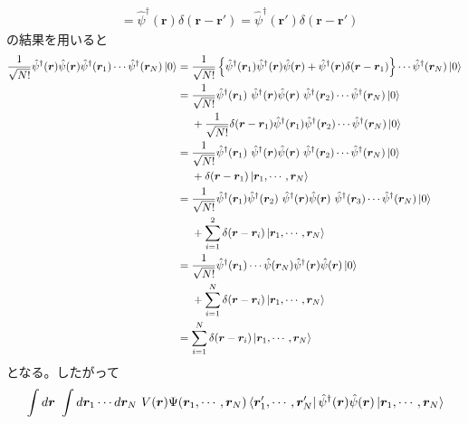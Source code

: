 \documentclass[dvipdfmx, 11pt, a4paper]{jsarticle}
\theoremstyle{definition}
\numberwithin{equation}{section}
\begin{document}
\begin{derivationBox}
\begin{align}
            &=\hat{\psi}^\dagger(\bm{r}) \delta(\bm{r}-\bm{r'}) =\hat{\psi}^\dagger(\bm{r}') \delta(\bm{r}-\bm{r'}) 
        \end{align}
        の結果を用いると
        \begin{align}
            \frac{1}{\sqrt{N!}}\hat{\psi}^\dagger(\bm{r})\hat{\psi}(\bm{r}) \hat{\psi}^\dagger(\bm{r}_1)\cdots\hat{\psi}^\dagger(\bm{r}_N)\ket{0} &= \frac{1}{\sqrt{N!}}\left\{ \hat{\psi}^\dagger(\bm{r}_1)\hat{\psi}^\dagger(\bm{r})\hat{\psi}(\bm{r}) + \hat{\psi}^\dagger(\bm{r}) \delta(\bm{r}-\bm{r}_1)  \right\}\cdots\hat{\psi}^\dagger(\bm{r}_N)\ket{0} \notag \\
            &= \frac{1}{\sqrt{N!}} \hat{\psi}^\dagger(\bm{r}_1)\ \hat{\psi}^\dagger(\bm{r})\hat{\psi}(\bm{r})\ \hat{\psi}^\dagger(\bm{r}_2)\cdots\hat{\psi}^\dagger(\bm{r}_N)\ket{0} \notag \\
            &\ \ \ \ + \frac{1}{\sqrt{N!}} \delta(\bm{r}-\bm{r}_1)\hat{\psi}^\dagger(\bm{r}_1)\hat{\psi}^\dagger(\bm{r}_2)\cdots\hat{\psi}^\dagger(\bm{r}_N)\ket{0} \notag \\
            &= \frac{1}{\sqrt{N!}} \hat{\psi}^\dagger(\bm{r}_1)\ \hat{\psi}^\dagger(\bm{r})\hat{\psi}(\bm{r})\ \hat{\psi}^\dagger(\bm{r}_2)\cdots\hat{\psi}^\dagger(\bm{r}_N)\ket{0} \notag \\
            &\ \ \ \ + \delta(\bm{r}-\bm{r}_1)\ket{\bm{r}_1,\cdots,\bm{r}_N} \notag \\
            &= \frac{1}{\sqrt{N!}} \hat{\psi}^\dagger(\bm{r}_1)\hat{\psi}^\dagger(\bm{r}_2)\ \hat{\psi}^\dagger(\bm{r})\hat{\psi}(\bm{r})\ \hat{\psi}^\dagger(\bm{r}_3)\cdots\hat{\psi}^\dagger(\bm{r}_N)\ket{0} \notag \\
            &\ \ \ \ + \sum_{i=1}^2\delta(\bm{r}-\bm{r}_i)\ket{\bm{r}_1,\cdots,\bm{r}_N} \notag \\
            &= \frac{1}{\sqrt{N!}} \hat{\psi}^\dagger(\bm{r}_1)\cdots \hat{\psi}(\bm{r}_N) \hat{\psi}^\dagger(\bm{r})\hat{\psi}(\bm{r})\ket{0} \notag \\
            &\ \ \ \ + \sum_{i=1}^N\delta(\bm{r}-\bm{r}_i)\ket{\bm{r}_1,\cdots,\bm{r}_N} \notag \\
            &= \sum_{i=1}^N\delta(\bm{r}-\bm{r}_i)\ket{\bm{r}_1,\cdots,\bm{r}_N} \label{PotePoteKou}
        \end{align}
        となる。したがって
        \begin{align}
            &\int d\bm{r}\ \int d\bm{r}_1\cdots d\bm{r}_N\   V(\bm{r})\Psi(\bm{r}_1,\cdots,\bm{r}_N)\bra{\bm{r}'_1,\cdots,\bm{r}'_N}\hat{\psi}^\dagger(\bm{r})\hat{\psi}(\bm{r})\ket{\bm{r}_1, \cdots ,\bm{r}_N} \notag \\

\end{align}
\end{derivationBox}
\end{document}
